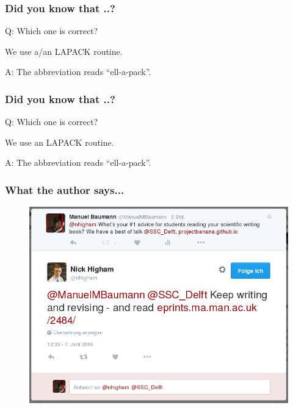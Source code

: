 \documentclass{beamer}
\begin{document}
\begin{frame}
\frametitle{Did you know that ..?}
Q: Which one is correct?
\\
\begin{center}
 We use {\color{red}a/an} LAPACK routine.
\end{center}
{\color{white}A: The abbreviation reads ``ell-a-pack''.}
\end{frame}

\begin{frame}[noframenumbering]
\frametitle{Did you know that ..?}
Q: Which one is correct?
\\
\begin{center}
 We use {\color{red}an} LAPACK routine.
\end{center}
A: The abbreviation reads ``ell-a-pack''.
\end{frame}

\begin{frame}
\frametitle{What the author says...}
  \begin{figure}
\centering
 \includegraphics[height=0.7\textheight]{images/twitter.png}
\end{figure}
\end{frame}

\begin{frame}
 \tableofcontents
\end{frame}
\end{document}

